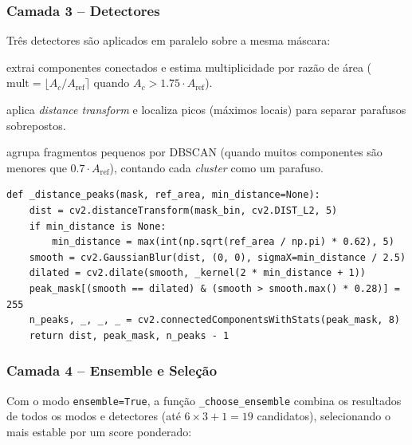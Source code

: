 \documentclass[12pt,a4paper]{article}
\begin{document}
\subsubsection{Camada 3 -- Detectores}

Tr\^es detectores s\~ao aplicados em paralelo sobre a mesma m\'ascara:

\begin{description}[leftmargin=*, style=nextline]
  \item[\texttt{detector\_contours}:] extrai componentes conectados e estima
    multiplicidade por raz\~ao de \'area ($\text{mult} = \lfloor A_c / A_{\text{ref}} \rceil$
    quando $A_c > 1.75 \cdot A_{\text{ref}}$).

  \item[\texttt{detector\_watershed}:] aplica \emph{distance transform} e localiza picos
    (m\'aximos locais) para separar parafusos sobrepostos.

  \item[\texttt{detector\_fragmentos\_dbscan}:] agrupa fragmentos pequenos por DBSCAN
    (quando muitos componentes s\~ao menores que $0.7 \cdot A_{\text{ref}}$), contando
    cada \emph{cluster} como um parafuso.
\end{description}

\begin{lstlisting}[caption={Watershed: picos do distance transform como separadores}]
def _distance_peaks(mask, ref_area, min_distance=None):
    dist = cv2.distanceTransform(mask_bin, cv2.DIST_L2, 5)
    if min_distance is None:
        min_distance = max(int(np.sqrt(ref_area / np.pi) * 0.62), 5)
    smooth = cv2.GaussianBlur(dist, (0, 0), sigmaX=min_distance / 2.5)
    dilated = cv2.dilate(smooth, _kernel(2 * min_distance + 1))
    peak_mask[(smooth == dilated) & (smooth > smooth.max() * 0.28)] = 255
    n_peaks, _, _, _ = cv2.connectedComponentsWithStats(peak_mask, 8)
    return dist, peak_mask, n_peaks - 1
\end{lstlisting}

\subsubsection{Camada 4 -- Ensemble e Sele\c{c}\~ao}

Com o modo \texttt{ensemble=True}, a fun\c{c}\~ao \texttt{\_choose\_ensemble}
combina os resultados de todos os modos e detectores (at\'e $6 \times 3 + 1 = 19$
candidatos), selecionando o mais estable por um score ponderado:
\end{document}
